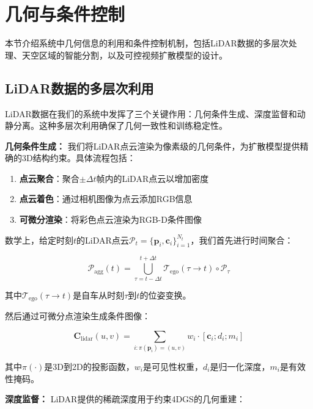 \section{几何与条件控制}

本节介绍系统中几何信息的利用和条件控制机制，包括LiDAR数据的多层次处理、天空区域的智能分割，以及可控视频扩散模型的设计。

\subsection{LiDAR数据的多层次利用}

LiDAR数据在我们的系统中发挥了三个关键作用：几何条件生成、深度监督和动静分离。这种多层次利用确保了几何一致性和训练稳定性。

\textbf{几何条件生成：}
我们将LiDAR点云渲染为像素级的几何条件，为扩散模型提供精确的3D结构约束。具体流程包括：

\begin{enumerate}
\item \textbf{点云聚合}：聚合$\pm\Delta t$帧内的LiDAR点云以增加密度
\item \textbf{点云着色}：通过相机图像为点云添加RGB信息
\item \textbf{可微分渲染}：将彩色点云渲染为RGB-D条件图像
\end{enumerate}

数学上，给定时刻$t$的LiDAR点云$\mathcal{P}_t = \{\mathbf{p}_i, \mathbf{c}_i\}_{i=1}^{N_t}$，我们首先进行时间聚合：

\begin{equation}
\mathcal{P}_{\text{agg}}(t) = \bigcup_{\tau=t-\Delta t}^{t+\Delta t} \mathcal{T}_{\text{ego}}(\tau \rightarrow t) \circ \mathcal{P}_\tau
\label{eq:lidar_aggregation}
\end{equation}

其中$\mathcal{T}_{\text{ego}}(\tau \rightarrow t)$是自车从时刻$\tau$到$t$的位姿变换。

然后通过可微分点渲染生成条件图像：

\begin{equation}
\mathbf{C}_{\text{lidar}}(u,v) = \sum_{i: \pi(\mathbf{p}_i) = (u,v)} w_i \cdot [\mathbf{c}_i; d_i; m_i]
\label{eq:lidar_condition_generation}
\end{equation}

其中$\pi(\cdot)$是3D到2D的投影函数，$w_i$是可见性权重，$d_i$是归一化深度，$m_i$是有效性掩码。

\textbf{深度监督：}
LiDAR提供的稀疏深度用于约束4DGS的几何重建：

